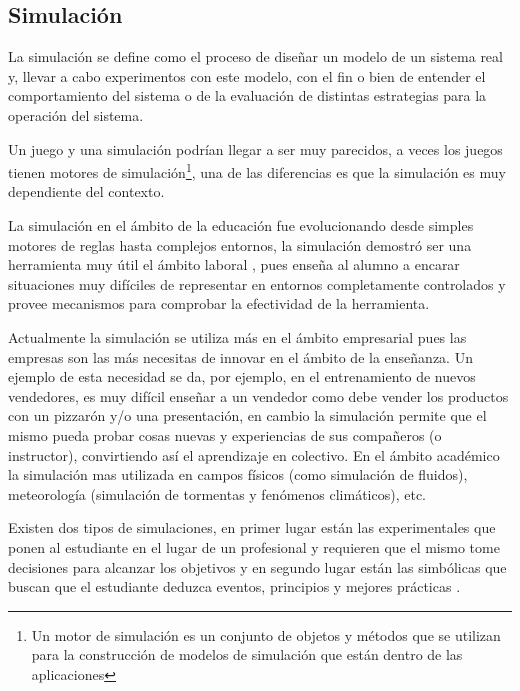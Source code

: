 
\subsection{Simulación}

La simulación se define como el proceso de diseñar un modelo de un sistema real
y, llevar a cabo experimentos con este modelo, con el fin o bien de entender el
comportamiento del sistema o de la evaluación de distintas estrategias para la
operación del sistema\cite{ingalls2008introduction}. 

Un juego y una simulación podrían llegar a ser muy parecidos, a veces los juegos
tienen motores de simulación\footnote{Un motor de simulación es un conjunto de
	objetos y métodos que se utilizan para la construcción de modelos de
	simulación que están dentro de las aplicaciones}, una de las diferencias
es que la simulación es muy dependiente del contexto. 

La simulación en el ámbito de la educación fue evolucionando desde simples
motores de reglas hasta complejos entornos, la simulación demostró ser una
herramienta muy útil el ámbito laboral \cite{mariluz:seiousgames}, pues enseña
al alumno a encarar situaciones muy difíciles de representar en entornos
completamente controlados y provee mecanismos para comprobar la efectividad de
la herramienta. 

Actualmente la simulación se utiliza más en el ámbito empresarial pues las
empresas son las más necesitas de innovar en el ámbito de la enseñanza. Un
ejemplo de esta necesidad se da, por ejemplo, en el entrenamiento de nuevos
vendedores, es muy difícil enseñar a un vendedor como debe vender los productos
con un pizzarón y/o una presentación, en cambio la simulación permite que el
mismo pueda probar cosas nuevas y experiencias de sus compañeros (o instructor),
convirtiendo así el aprendizaje en colectivo\cite{mariluz:seiousgames}. En el
ámbito académico la simulación mas utilizada en campos físicos (como simulación
de fluidos), meteorología (simulación de tormentas y fenómenos climáticos), etc. 

Existen dos tipos de simulaciones, en primer lugar están las experimentales que
ponen al estudiante en el lugar de un profesional y requieren que el mismo tome
decisiones para alcanzar los objetivos y en segundo lugar están las simbólicas
que buscan que el estudiante deduzca eventos, principios y mejores prácticas
\cite{charsky:2010}. 

